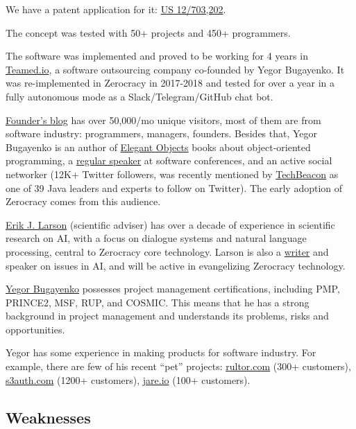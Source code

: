 \documentclass{main}
\begin{document}
We have a patent application for it:
\href{https://patents.google.com/patent/US20110196798}{US 12/703,202}.

The concept was tested with 50+ projects and 450+ programmers.

The software was implemented and proved to be working for 4 years in
\href{http://www.teamed.io}{Teamed.io},
a software outsourcing company co-founded by Yegor Bugayenko.
It was re-implemented in Zerocracy in 2017-2018 and tested for over a year
in a fully autonomous mode as a Slack/Telegram/GitHub chat bot.

\href{http://www.yegor256.com}{Founder's blog} has over 50,000/mo unique visitors, most of them are from
software industry: programmers, managers, founders. Besides that, Yegor
Bugayenko is an author of \href{https://amzn.to/2bYXQy7}{Elegant Objects} books about object-oriented
programming, a \href{https://lanyrd.com/profile/yegor256/}{regular speaker} at software conferences, and an active social
networker (12K+ Twitter followers, was recently mentioned by \href{https://techbeacon.com/java-leaders-you-should-follow-twitter}{TechBeacon} as one
of 39 Java leaders and experts to follow on Twitter). The
early adoption of Zerocracy comes from this audience.

\href{https://www.linkedin.com/in/erik-larson-b287ba9}{Erik J. Larson} (scientific adviser) has over a decade of experience in
scientific research on AI, with a focus on dialogue systems and natural language
processing, central to Zerocracy core technology. Larson is also a
\href{https://www.theatlantic.com/technology/archive/2015/05/the-humanists-paradox/391622/}{writer} and
speaker on issues in AI, and will be active in evangelizing Zerocracy
technology.

\href{http://www.yegor256.com/about-me.html}{Yegor Bugayenko} possesses project management certifications, including PMP,
PRINCE2, MSF, RUP, and COSMIC. This means that he has a strong background in
project management and understands its problems, risks and opportunities.

Yegor has some experience in making products for software industry. For example,
there are few of his recent ``pet'' projects:
\href{http://www.rultor.com}{rultor.com} (300+ customers),
\href{http://www.s3auth.com}{s3auth.com} (1200+ customers),
\href{http://www.jare.io}{jare.io} (100+ customers).

\subsection{Weaknesses}
\end{document}

